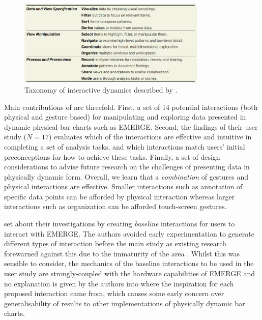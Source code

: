 \documentclass[11pt]{article}
\begin{document}
\begin{figure}[H]
\centering
\includegraphics[width=0.8\textwidth]{img/heer2012-taxonomy.png} 
\caption{Taxonomy of interactive dynamics described by \protect\citet{heer2012}.}\label{fig:heer2012-taxonomy}
\end{figure}

Main contributions of \citet{taher2015} are threefold. First, a set of 14 potential interactions (both physical and gesture based) for manipulating and exploring data presented in dynamic physical bar charts such as EMERGE. Second, the findings of their user study ($N=17$) evaluates which of the interactions are effective and intuitive in completing a set of analysis tasks, and which interactions match users' initial preconceptions for how to achieve these tasks. Finally, a set of design considerations to advise future research on the challenges of presenting data in physically dynamic form. Overall, we learn that a \textit{combination} of gestures and physical interactions are effective. Smaller interactions such as annotation of specific data points can be afforded by physical interaction whereas larger interactions such as organization can be afforded touch-screen gestures. 

\citeauthor{taher2015} set about their investigations by creating \textit{baseline} interactions for users to interact with EMERGE. The authors avoided early experimentation to generate different types of interaction before the main study as existing research forewarned against this due to the immaturity of the area \citep{hornbaek2013}. Whilst this was sensible to consider, the mechanics of the baseline interactions to be used in the user study are strongly-coupled with the hardware capabilities of EMERGE and no explanation is given by the authors into where the inspiration for each proposed interaction came from, which causes some early concern over generalisability of results to other implementations of physically dynamic bar charts.
\end{document}
